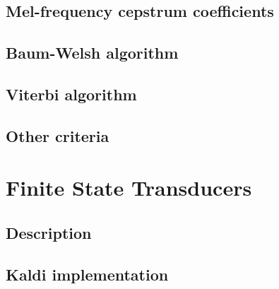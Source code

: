 \subsection[MFCC coefficients]{Mel-frequency cepstrum coefficients}
\label{sub:mel_frequency_cepstrum_coefficients}



\subsection{Baum-Welsh algorithm}
\label{sub:baum_welsh_algorithm}




\subsection{Viterbi algorithm}
\label{sub:viterbi_algorithm}


\subsection{Other criteria}
\label{sub:other_criteria}




\section{Finite State Transducers} 
\label{sec:fst}

\subsection{Description}
\label{sub:description}


\subsection{Kaldi implementation} %
\label{sec:kaldi}


